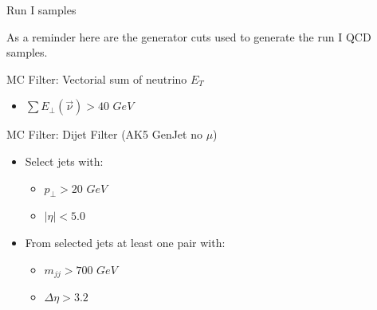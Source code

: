 \documentclass[8pt]{beamer}
\begin{document}
\begin{frame}{Run I samples}

As a reminder here are the generator cuts used to generate the run I QCD samples.

\begin{block}{MC Filter: Vectorial sum of neutrino $E_T$}

\begin{itemize}
  \item $\sum E_\perp(\vec{\nu}) > 40$ $GeV$
\end{itemize}

\end{block}

\begin{block}{MC Filter: Dijet Filter (AK5 GenJet no $\mu$)}

\begin{itemize}
  \item Select jets with:
  \begin{itemize}
    \item $p_\perp>20$ $GeV$
    \item $|\eta|<5.0$
  \end{itemize}
  \item From selected jets at least one pair with:
  \begin{itemize}
    \item $m_{jj}>700$ $GeV$
    \item $\Delta\eta>3.2$
  \end{itemize}    
\end{itemize}

\end{block}

\end{frame}
\end{document}
